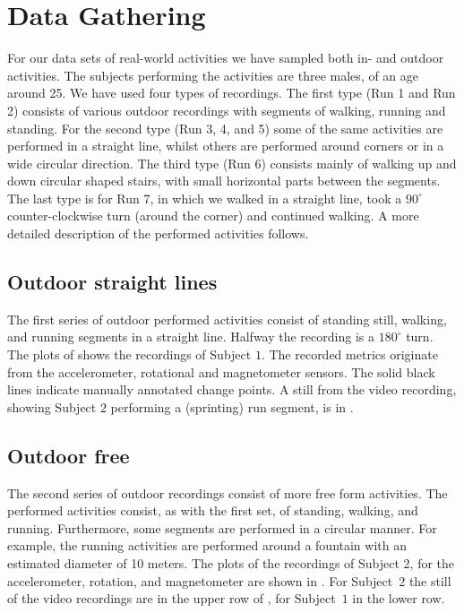 \section{Data Gathering}\label{sec:data_gathering}
For our data sets of real-world activities we have sampled both in- and outdoor activities.
The subjects performing the activities are three males, of an age around 25.
We have used four types of recordings.
The first type (Run 1 and Run 2) consists of various outdoor recordings with segments of walking, running and standing.
For the second type (Run 3, 4, and 5) some of the same activities are performed in a straight line, whilst others are performed around corners or in a wide circular direction.
The third type (Run 6) consists mainly of walking up and down circular shaped stairs, with small horizontal parts between the segments.
The last type is for Run 7, in which we walked in a straight line, took a $90^{\circ}$ counter-clockwise turn (around the corner) and continued walking.
A more detailed description of the performed activities follows.

\subsection{Outdoor straight lines}\label{subsec:outdoor_straight}
The first series of outdoor performed activities consist of standing still, walking, and running segments in a straight line.
Halfway the recording is a $180^{\circ}$ turn.
The plots of  shows the recordings of Subject $1$.
The recorded metrics originate from the accelerometer, rotational and magnetometer sensors.
The solid black lines indicate manually annotated change points.
A still from the video recording, showing Subject $2$ performing a (sprinting) run segment, is in .

\subsection{Outdoor free}\label{subsec:outdoor_free}
The second series of outdoor recordings consist of more free form activities.
The performed activities consist, as with the first set, of standing, walking, and running.
Furthermore, some segments are performed in a circular manner.
For example, the running activities are performed around a fountain with an estimated diameter of 10 meters.
The plots of the recordings of Subject 2, for the accelerometer, rotation, and magnetometer are shown in .
For Subject~$2$ the still of the video recordings are in the upper row of , for Subject~$1$ in the lower row.

